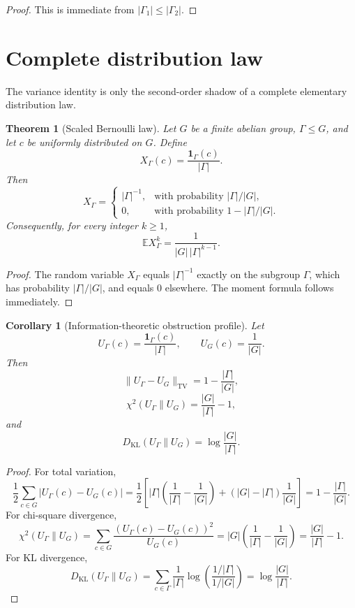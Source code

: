 \documentclass[11pt]{article}
\newtheorem{theorem}{Theorem}
\newtheorem{corollary}{Corollary}
\newcommand{\1}{\mathbf 1}
\begin{document}
\begin{proof}
This is immediate from \(|\Gamma_1|\le|\Gamma_2|\).
\end{proof}

\section{Complete distribution law}

The variance identity is only the second-order shadow of a complete elementary distribution law.

\begin{theorem}[Scaled Bernoulli law]
Let \(G\) be a finite abelian group, \(\Gamma\le G\), and let \(c\) be uniformly distributed on \(G\). Define
\[
X_\Gamma(c)=\frac{\mathbf 1_\Gamma(c)}{|\Gamma|}.
\]
Then
\[
X_\Gamma=
\begin{cases}
|\Gamma|^{-1},&\text{with probability }|\Gamma|/|G|,\\
0,&\text{with probability }1-|\Gamma|/|G|.
\end{cases}
\]
Consequently, for every integer \(k\ge1\),
\[
\mathbb E X_\Gamma^k
=
\frac1{|G|\,|\Gamma|^{k-1}}.
\]
\end{theorem}

\begin{proof}
The random variable \(X_\Gamma\) equals \(|\Gamma|^{-1}\) exactly on the subgroup \(\Gamma\), which has probability \(|\Gamma|/|G|\), and equals \(0\) elsewhere.  The moment formula follows immediately.
\end{proof}

\begin{corollary}[Information-theoretic obstruction profile]
Let
\[
U_\Gamma(c)=\frac{\mathbf 1_\Gamma(c)}{|\Gamma|},
\qquad
U_G(c)=\frac1{|G|}.
\]
Then
\[
\|U_\Gamma-U_G\|_{\mathrm{TV}}
=
1-\frac{|\Gamma|}{|G|},
\]
\[
\chi^2(U_\Gamma\|U_G)
=
\frac{|G|}{|\Gamma|}-1,
\]
and
\[
D_{\mathrm{KL}}(U_\Gamma\|U_G)
=
\log\frac{|G|}{|\Gamma|}.
\]
\end{corollary}

\begin{proof}
For total variation,
\[
\frac12\sum_{c\in G}\left|U_\Gamma(c)-U_G(c)\right|
=
\frac12\left[
|\Gamma|\left(\frac1{|\Gamma|}-\frac1{|G|}\right)
+
(|G|-|\Gamma|)\frac1{|G|}
\right]
=
1-\frac{|\Gamma|}{|G|}.
\]
For chi-square divergence,
\[
\chi^2(U_\Gamma\|U_G)
=
\sum_{c\in G}\frac{(U_\Gamma(c)-U_G(c))^2}{U_G(c)}
=
|G|\left(\frac1{|\Gamma|}-\frac1{|G|}\right)
=
\frac{|G|}{|\Gamma|}-1.
\]
For KL divergence,
\[
D_{\mathrm{KL}}(U_\Gamma\|U_G)
=
\sum_{c\in\Gamma}\frac1{|\Gamma|}
\log\left(\frac{1/|\Gamma|}{1/|G|}\right)
=
\log\frac{|G|}{|\Gamma|}.
\]
\end{proof}
\end{document}

